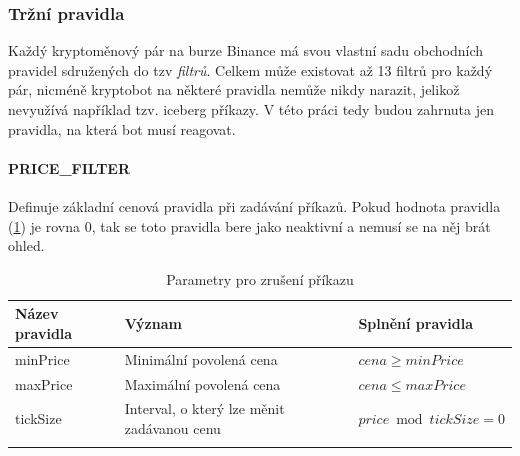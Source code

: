 

\subsubsection{Tržní pravidla}
Každý kryptoměnový pár na burze Binance má svou vlastní sadu obchodních pravidel sdružených do tzv \emph{filtrů}. Celkem může existovat až 13 filtrů pro každý pár, nicméně kryptobot na některé
pravidla nemůže nikdy narazit, jelikož nevyužívá například tzv. iceberg příkazy. V této práci tedy budou zahrnuta jen pravidla, na která bot musí reagovat.


\paragraph*{PRICE\_FILTER}
Definuje základní cenová pravidla při zadávání příkazů. Pokud hodnota pravidla (\ref{tab:binance:price_filter}) je rovna 0, tak se toto pravidla bere jako neaktivní a nemusí se na něj brát ohled.
\begin{center}
    \begin{longtable}[h]{|l|l|l|}
        \hline
        Název pravidla & Význam                                     & Splnění pravidla           \\
        \hline
        minPrice       & Minimální povolená cena                    & $ cena \geq  minPrice $    \\ 
        \hline
        maxPrice       & Maximální povolená cena                    & $ cena \leq maxPrice $     \\ 
        \hline
        tickSize       & Interval, o který lze měnit zadávanou cenu & $price \bmod tickSize = 0$ \\ 
        \hline
        \caption{Parametry pro zrušení příkazu}
        \label{tab:binance:price_filter}
    \end{longtable}
\end{center}

